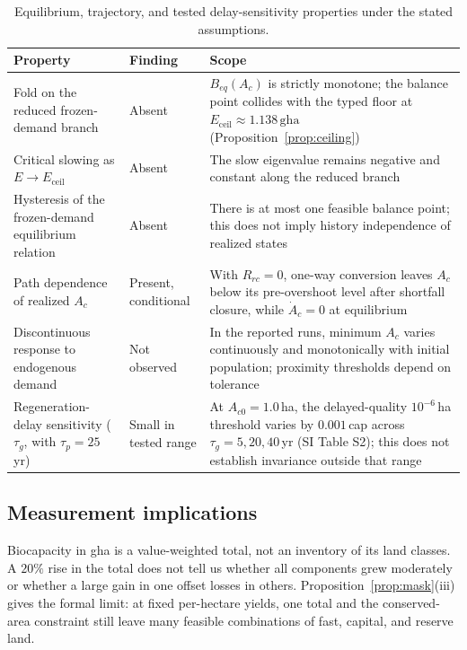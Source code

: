 \documentclass[preprint,12pt,authoryear]{elsarticle}
\newcommand{\Eceil}{E_{\mathrm{ceil}}}
\begin{document}
\begin{table}[!htbp]
\centering\footnotesize
\caption{Equilibrium, trajectory, and tested delay-sensitivity properties under the stated assumptions.}
\label{tab:neg}
\begin{tabularx}{\textwidth}{>{\raggedright\arraybackslash}p{} l >{\raggedright\arraybackslash}X}
\toprule
Property & Finding & Scope \\
\midrule
Fold on the reduced frozen-demand branch & Absent & $B_{eq}(A_c)$ is strictly monotone; the balance point collides with the typed floor at $\Eceil\approx1.138\,\mathrm{gha}$ (Proposition~\ref{prop:ceiling}) \\
Critical slowing as $E\to\Eceil$ & Absent & The slow eigenvalue remains negative and constant along the reduced branch \\
Hysteresis of the frozen-demand equilibrium relation & Absent & There is at most one feasible balance point; this does not imply history independence of realized states \\
Path dependence of realized $A_c$ & Present, conditional & With $R_{rc}=0$, one-way conversion leaves $A_c$ below its pre-overshoot level after shortfall closure, while $\dot A_c=0$ at equilibrium \\
Discontinuous response to endogenous demand & Not observed & In the reported runs, minimum $A_c$ varies continuously and monotonically with initial population; proximity thresholds depend on tolerance \\
Regeneration-delay sensitivity ($\tau_g$, with $\tau_p=25$\,yr) & Small in tested range & At $A_{c0}=1.0$\,ha, the delayed-quality $10^{-6}$\,ha threshold varies by $0.001$\,cap across $\tau_g=5,20,40$\,yr (SI Table S2); this does not establish invariance outside that range \\
\bottomrule
\end{tabularx}
\end{table}
\clearpage

\subsection{Measurement implications}

Biocapacity in gha is a value-weighted total, not an inventory of its land classes. A $20\%$ rise in the total does not tell us whether all components grew moderately or whether a large gain in one offset losses in others. Proposition~\ref{prop:mask}(iii) gives the formal limit: at fixed per-hectare yields, one total and the conserved-area constraint still leave many feasible combinations of fast, capital, and reserve land.
\end{document}
